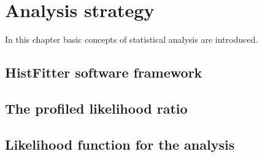 \chapter{Analysis strategy}
In this chapter basic concepts of statistical analysis are introduced.

\section{HistFitter software framework}
\lipsum

\section{The profiled likelihood ratio}
\lipsum

\section{Likelihood function for the \mph analysis}
\lipsum
